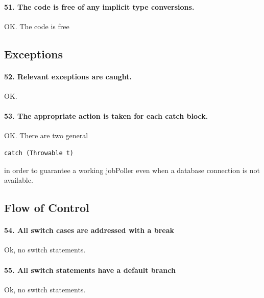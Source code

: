 \documentclass[english]{article}
\begin{document}
\paragraph{51. The code is free of any implicit type conversions.}
OK. The code is free 
\subsection{Exceptions}

\paragraph{52. Relevant exceptions are caught.}
OK.
\paragraph{53. The appropriate action is taken for each catch block.}
OK. There are two general
\begin{lstlisting}
catch (Throwable t)
\end{lstlisting} in order to guarantee a working jobPoller even when a database connection is not available.

\subsection{Flow of Control}
\paragraph{54. All switch cases are addressed with a break}
Ok, no switch statements.

\paragraph{55. All switch statements have a default branch}
Ok, no switch statements.
\end{document}
